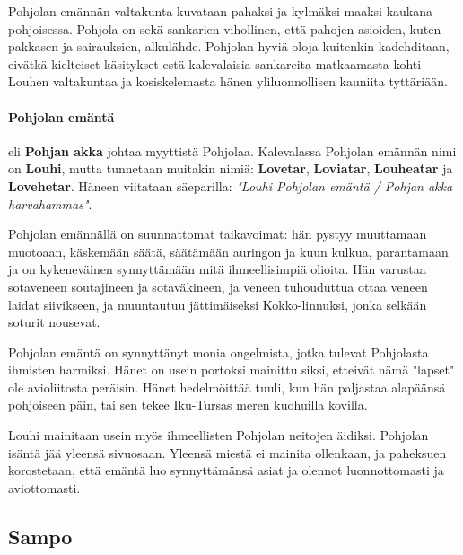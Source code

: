   Pohjolan emännän valtakunta kuvataan pahaksi ja kylmäksi maaksi kaukana pohjoisessa. Pohjola
  on sekä sankarien vihollinen, että pahojen asioiden, kuten pakkasen ja sairauksien, alkulähde.
  Pohjolan hyviä oloja kuitenkin kadehditaan, eivätkä kielteiset käsitykset estä kalevalaisia
  sankareita matkaamasta kohti Louhen valtakuntaa ja kosiskelemasta hänen yliluonnollisen kauniita
  tyttäriään.

  \paragraph{Pohjolan emäntä} eli \textbf{Pohjan akka} johtaa myyttistä Pohjolaa. Kalevalassa
  Pohjolan emännän nimi on \textbf{Louhi}, mutta tunnetaan muitakin nimiä: \textbf{Lovetar},
  \textbf{Loviatar}, \textbf{Louheatar} ja \textbf{Lovehetar}. Häneen viitataan säeparilla:
  \emph{"Louhi Pohjolan emäntä / Pohjan akka harvahammas"}.\par
  Pohjolan emännällä on suunnattomat taikavoimat: hän pystyy muuttamaan muotoaan, käskemään säätä,
  säätämään auringon ja kuun kulkua, parantamaan ja on kykeneväinen synnyttämään mitä
  ihmeellisimpiä olioita. Hän varustaa sotaveneen soutajineen ja sotaväkineen, ja veneen
  tuhouduttua ottaa veneen laidat siivikseen, ja muuntautuu jättimäiseksi Kokko-linnuksi, jonka
  selkään soturit nousevat. \par
  Pohjolan emäntä on synnyttänyt monia ongelmista, jotka tulevat Pohjolasta ihmisten harmiksi.
  Hänet on usein portoksi mainittu siksi, etteivät nämä "lapset" ole avioliitosta peräisin. Hänet
  hedelmöittää tuuli, kun hän paljastaa alapäänsä pohjoiseen päin, tai sen tekee Iku-Tursas meren
  kuohuilla kovilla. \par
  Louhi mainitaan usein myös ihmeellisten Pohjolan neitojen äidiksi. Pohjolan isäntä jää yleensä
  sivuosaan. Yleensä miestä ei mainita ollenkaan, ja paheksuen korostetaan, että emäntä luo
  synnyttämänsä asiat ja olennot luonnottomasti ja aviottomasti.


\subsection{Sampo}


